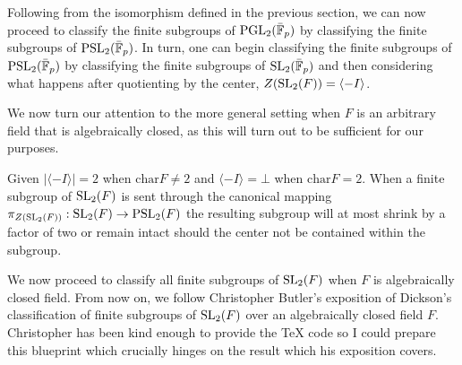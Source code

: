 Following from the isomorphism defined in the previous section, we can now proceed to classify the finite subgroups of $\operatorname{PGL}_2(\bar{\mathbb{F}}_p)$ by classifying the finite subgroups of $\operatorname{PSL}_2(\bar{\mathbb{F}}_p)$. 
In turn, one can begin classifying the finite subgroups of $\operatorname{PSL}_2(\bar{\mathbb{F}}_p)$ by classifying the finite subgroups of $\operatorname{SL}_2(\bar{\mathbb{F}}_p)$ and then considering what happens after quotienting by the center, $Z(\operatorname{SL}_2(F)) = \langle -I\rangle$.

We now turn our attention to the more general setting when $F$ is an arbitrary field that is algebraically closed, as this will turn out to be sufficient for our purposes.

Given $|\langle -I \rangle| = 2$ when $\textrm{char} F \ne 2$ and $\langle -I\rangle = \bot$ when $\textrm{char} F = 2$.
When a finite subgroup of $\operatorname{SL}_2(F)$ is sent through the canonical mapping $\pi_{Z(\operatorname{SL}_2(F))} : \operatorname{SL}_2(F) \rightarrow \operatorname{PSL}_2(F)$ the resulting subgroup will at most shrink by a factor of two or remain intact should the center not be contained within the subgroup. 

We now proceed to classify all finite subgroups of $\operatorname{SL}_2(F)$ when $F$ is algebraically closed field. 
From now on, we follow Christopher Butler's exposition of Dickson's classification of finite subgroups of $\operatorname{SL}_2(F)$ over an algebraically closed field $F$. Christopher has been kind enough to provide the TeX code so I could prepare this blueprint which crucially hinges on the result which his exposition covers.